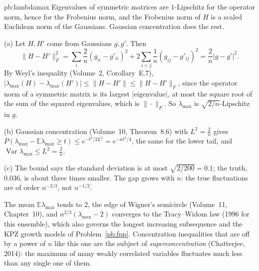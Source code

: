 \begin{solution}{pb:lambdamax}
\idea Eigenvalues of symmetric matrices are $1$-Lipschitz for the operator norm, hence for the Frobenius norm, and the Frobenius norm of $H$ is a scaled Euclidean norm of
the Gaussians. Gaussian concentration does the rest.

\writeup (a) Let $H,H'$ come from Gaussians $g,g'$. Then
\[
\|H-H'\|_F^2=\sum_i\frac2n(g_{ii}-g'_{ii})^2+2\sum_{i<j}\frac1n(g_{ij}-g'_{ij})^2=\frac2n|g-g'|^2.
\]
By Weyl's inequality (Volume~2, Corollary~E.7), $|\lambda_{\max}(H)-\lambda_{\max}(H')|\le\|H-H'\|\le\|H-H'\|_F$, since the operator norm of a symmetric matrix is its largest
$|\text{eigenvalue}|$, at most the square root of the sum of the squared eigenvalues, which is $\|\cdot\|_F$. So $\lambda_{\max}$ is $\sqrt{2/n}$-Lipschitz in $g$.

(b) Gaussian concentration (Volume~10, Theorem~8.6) with $L^2=\frac2n$ gives $P(\lambda_{\max}-\mathbb E\lambda_{\max}\ge t)\le e^{-t^2/2L^2}=e^{-nt^2/4}$, the same for the lower
tail, and $\operatorname{Var}\lambda_{\max}\le L^2=\frac2n$.

(c) The bound says the standard deviation is at most $\sqrt{2/200}=0.1$; the truth, $0.036$, is about three times smaller. The gap grows with $n$: the true fluctuations are of
order $n^{-2/3}$, not $n^{-1/2}$.

\leads The mean $\mathbb E\lambda_{\max}$ tends to $2$, the edge of Wigner's semicircle (Volume~11, Chapter~10), and $n^{2/3}(\lambda_{\max}-2)$ converges to the Tracy--Widom law
(1996 for this ensemble), which also governs the longest increasing subsequence and the KPZ growth models of Problem~\ref{pb:fpp}. Concentration inequalities that are off by a
power of $n$ like this one are the subject of \emph{superconcentration} (Chatterjee, 2014): the maximum of many weakly correlated variables fluctuates much less than any
single one of them.
\end{solution}

